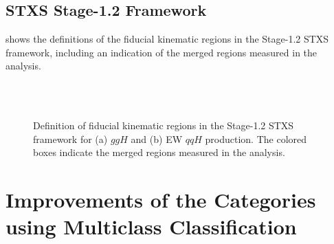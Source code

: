 \FloatBarrier
\section{STXS Stage-1.2 Framework}
\label{app:stxs-measurements-aux}

 shows the definitions of the fiducial kinematic regions in the Stage-1.2 STXS framework, including an indication of the merged regions measured in the \HWW analysis. 

\begin{figure}[h]
    \centering
     \\
     \\
    {\caption{Definition of fiducial kinematic regions in the Stage-1.2 STXS framework for (a) $ggH$ and (b) EW $qqH$ production. The colored boxes indicate the merged regions measured in the \HWW analysis.
            \label{fig:stxs:stage-12-definition} }}
\end{figure}


\chapter{Improvements of the \TwoJet Categories using Multiclass Classification}
\label{app:multi-class-2jet-strategy}






